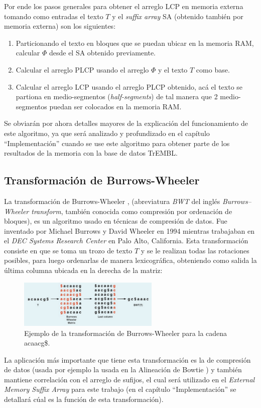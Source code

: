 Por ende los pasos generales para obtener el arreglo LCP en memoria externa tomando como entradas el texto $T$ y el \textit{suffix array} SA (obtenido también por memoria externa) son los siguientes:

\begin{enumerate}

\item Particionando el texto en bloques que se puedan ubicar en la memoria RAM, calcular $\Phi$ desde el SA obtenido previamente.
\item Calcular el arreglo PLCP usando el arreglo $\Phi$ y el texto $T$ como base.
\item Calcular el arreglo LCP usando el arreglo PLCP obtenido, acá el texto se partiona en medio-segmentos (\textit{half-segments}) de tal manera que 2 medio-segmentos puedan ser colocados en la memoria RAM.

\end{enumerate}

Se obviarán por ahora detalles mayores de la explicación del funcionamiento de este algoritmo, ya que será analizado y profundizado en el capítulo ``Implementación'' cuando se use este algoritmo para obtener parte de los resultados de la memoria con la base de datos TrEMBL.

\subsection{Transformación de Burrows-Wheeler}

La transformación de Burrows-Wheeler \cite{bwt}, (abreviatura \textit{BWT} del inglés \textit{Burrows–Wheeler transform}, también conocida como compresión por ordenación de bloques), es un algoritmo usado en técnicas de compresión de datos. Fue inventado por Michael Burrows y David Wheeler en 1994 mientras trabajaban en el \textit{DEC Systems Research Center} en Palo Alto, California. Esta transformación consiste en que se toma un trozo de texto $T$ y se le realizan todas las rotaciones posibles, para luego ordenarlas de manera lexicográfica, obteniendo como salida la última columna ubicada en la derecha de la matriz:

\begin{figure}[h]
    \centering
    \includegraphics[width=0.6\textwidth]{./images/bwtejemplo.png}
    \caption{Ejemplo de la transformación de Burrows-Wheeler para la cadena acaacg\$.}
    \label{fig:comb3}
\end{figure}

La aplicación más importante que tiene esta transformación es la de compresión de datos (usada por ejemplo la usada en la Alineación de Bowtie \cite{bowtie}) y también mantiene correlación con el arreglo de sufijos, el cual será utilizado en el \textit{External Memory Suffix Array} para este trabajo (en el capítulo ``Implementación'' se detallará cúal es la función de esta transformación).

